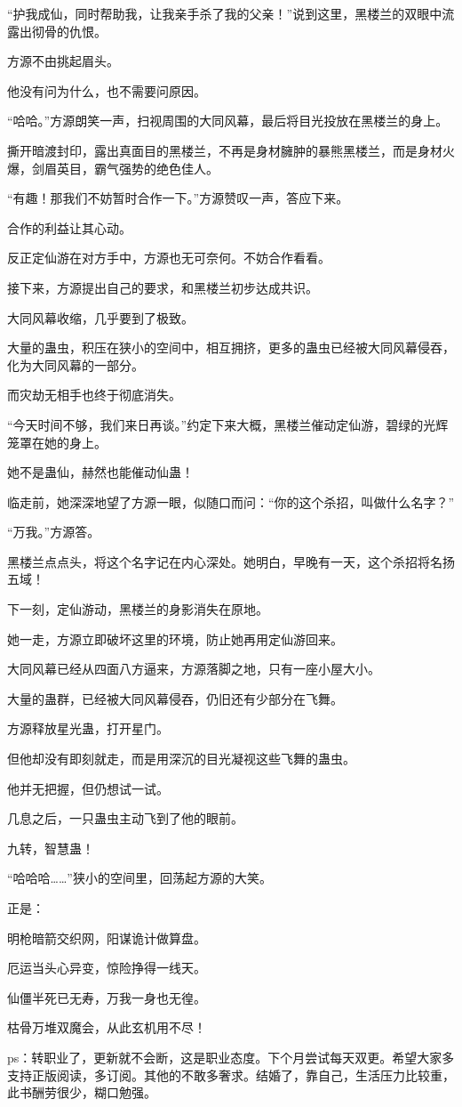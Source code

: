 \begin{this_body}
“护我成仙，同时帮助我，让我亲手杀了我的父亲！”说到这里，黑楼兰的双眼中流露出彻骨的仇恨。

方源不由挑起眉头。

他没有问为什么，也不需要问原因。

“哈哈。”方源朗笑一声，扫视周围的大同风幕，最后将目光投放在黑楼兰的身上。

撕开暗渡封印，露出真面目的黑楼兰，不再是身材臃肿的暴熊黑楼兰，而是身材火爆，剑眉英目，霸气强势的绝色佳人。

“有趣！那我们不妨暂时合作一下。”方源赞叹一声，答应下来。

合作的利益让其心动。

反正定仙游在对方手中，方源也无可奈何。不妨合作看看。

接下来，方源提出自己的要求，和黑楼兰初步达成共识。

大同风幕收缩，几乎要到了极致。

大量的蛊虫，积压在狭小的空间中，相互拥挤，更多的蛊虫已经被大同风幕侵吞，化为大同风幕的一部分。

而灾劫无相手也终于彻底消失。

“今天时间不够，我们来日再谈。”约定下来大概，黑楼兰催动定仙游，碧绿的光辉笼罩在她的身上。

她不是蛊仙，赫然也能催动仙蛊！

临走前，她深深地望了方源一眼，似随口而问：“你的这个杀招，叫做什么名字？”

“万我。”方源答。

黑楼兰点点头，将这个名字记在内心深处。她明白，早晚有一天，这个杀招将名扬五域！

下一刻，定仙游动，黑楼兰的身影消失在原地。

她一走，方源立即破坏这里的环境，防止她再用定仙游回来。

大同风幕已经从四面八方逼来，方源落脚之地，只有一座小屋大小。

大量的蛊群，已经被大同风幕侵吞，仍旧还有少部分在飞舞。

方源释放星光蛊，打开星门。

但他却没有即刻就走，而是用深沉的目光凝视这些飞舞的蛊虫。

他并无把握，但仍想试一试。

几息之后，一只蛊虫主动飞到了他的眼前。

九转，智慧蛊！

“哈哈哈……”狭小的空间里，回荡起方源的大笑。

正是：

明枪暗箭交织网，阳谋诡计做算盘。

厄运当头心异变，惊险挣得一线天。

仙僵半死已无寿，万我一身也无徨。

枯骨万堆双魔会，从此玄机用不尽！

ps：转职业了，更新就不会断，这是职业态度。下个月尝试每天双更。希望大家多支持正版阅读，多订阅。其他的不敢多奢求。结婚了，靠自己，生活压力比较重，此书酬劳很少，糊口勉强。

\end{this_body}

